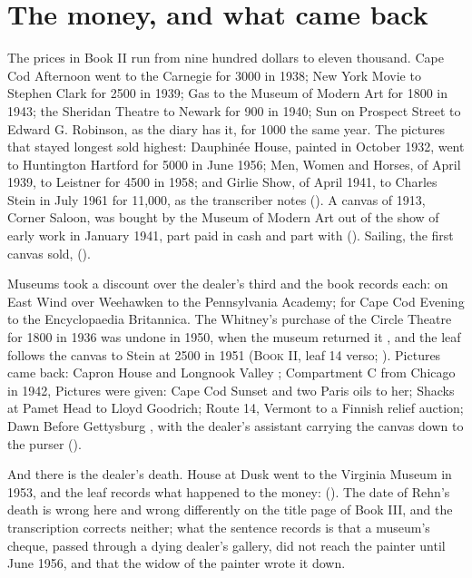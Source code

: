 \section{The money, and what came back}

The prices in Book II run from nine hundred dollars to eleven thousand. Cape Cod Afternoon went to the Carnegie for 3000 in 1938; New York Movie to Stephen Clark for 2500 in 1939; Gas to the Museum of Modern Art for 1800 in 1943; the Sheridan Theatre to Newark for 900 in 1940; Sun on Prospect Street to Edward G. Robinson,  as the diary has it, for 1000 the same year. The pictures that stayed longest sold highest: Dauphinée House, painted in October 1932, went to Huntington Hartford for 5000 in June 1956; Men, Women and Horses, of April 1939, to Leistner for 4500 in 1958; and Girlie Show, of April 1941, to Charles Stein in July 1961 for 11,000,  as the transcriber notes (). A canvas of 1913, Corner Saloon, was bought by the Museum of Modern Art out of the show of early work in January 1941, part paid in cash and part with  (). Sailing, the first canvas sold,  ().

Museums took a discount over the dealer's third and the book records each:  on East Wind over Weehawken to the Pennsylvania Academy;  for Cape Cod Evening to the Encyclopaedia Britannica. The Whitney's purchase of the Circle Theatre for 1800 in 1936 was undone in 1950, when the museum returned it , and the leaf follows the canvas to Stein at 2500 in 1951 (\textsc{Book II}, leaf 14 verso; ). Pictures came back: Capron House and Longnook Valley ; Compartment C from Chicago in 1942,  Pictures were given: Cape Cod Sunset and two Paris oils to her; Shacks at Pamet Head to Lloyd Goodrich; Route 14, Vermont to a Finnish relief auction; Dawn Before Gettysburg , with the dealer's assistant carrying the canvas down to the purser  ().

And there is the dealer's death. House at Dusk went to the Virginia Museum in 1953, and the leaf records what happened to the money:  (). The date of Rehn's death is wrong here and wrong differently on the title page of Book III, and the transcription corrects neither; what the sentence records is that a museum's cheque, passed through a dying dealer's gallery, did not reach the painter until June 1956, and that the widow of the painter wrote it down.

